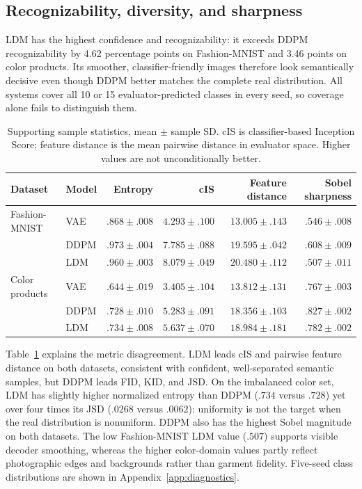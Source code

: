\documentclass{article}
\begin{document}
\subsection{Recognizability, diversity, and sharpness}
LDM has the highest confidence and recognizability: it exceeds DDPM recognizability by 4.62 percentage points on Fashion-MNIST and 3.46 points on color products. Its smoother, classifier-friendly images therefore look semantically decisive even though DDPM better matches the complete real distribution. All systems cover all 10 or 15 evaluator-predicted classes in every seed, so coverage alone fails to distinguish them.

\begin{table}[H]
\caption{Supporting sample statistics, mean $\pm$ sample SD. cIS is classifier-based Inception Score; feature distance is the mean pairwise distance in evaluator space. Higher values are not unconditionally better.}
\label{tab:supporting}
\centering
\scriptsize
\begin{tabular}{llrrrr}
\toprule
Dataset & Model & Entropy & cIS & Feature distance & Sobel sharpness \\
\midrule
Fashion-MNIST & VAE  & $.868\pm.008$ & $4.293\pm.100$ & $13.005\pm.143$ & $.546\pm.008$ \\
 & DDPM & $.973\pm.004$ & $7.785\pm.088$ & $19.595\pm.042$ & $.608\pm.009$ \\
 & LDM  & $.960\pm.003$ & $8.079\pm.049$ & $20.480\pm.112$ & $.507\pm.011$ \\
\midrule
Color products & VAE  & $.644\pm.019$ & $3.405\pm.104$ & $13.812\pm.131$ & $.767\pm.003$ \\
 & DDPM & $.728\pm.010$ & $5.283\pm.091$ & $18.356\pm.103$ & $.827\pm.002$ \\
 & LDM  & $.734\pm.008$ & $5.637\pm.070$ & $18.984\pm.181$ & $.782\pm.002$ \\
\bottomrule
\end{tabular}
\end{table}

Table~\ref{tab:supporting} explains the metric disagreement. LDM leads cIS and pairwise feature distance on both datasets, consistent with confident, well-separated semantic samples, but DDPM leads FID, KID, and JSD. On the imbalanced color set, LDM has slightly higher normalized entropy than DDPM ($.734$ versus $.728$) yet over four times its JSD ($.0268$ versus $.0062$): uniformity is not the target when the real distribution is nonuniform. DDPM also has the highest Sobel magnitude on both datasets. The low Fashion-MNIST LDM value ($.507$) supports visible decoder smoothing, whereas the higher color-domain values partly reflect photographic edges and backgrounds rather than garment fidelity. Five-seed class distributions are shown in Appendix~\ref{app:diagnostics}.
\end{document}
